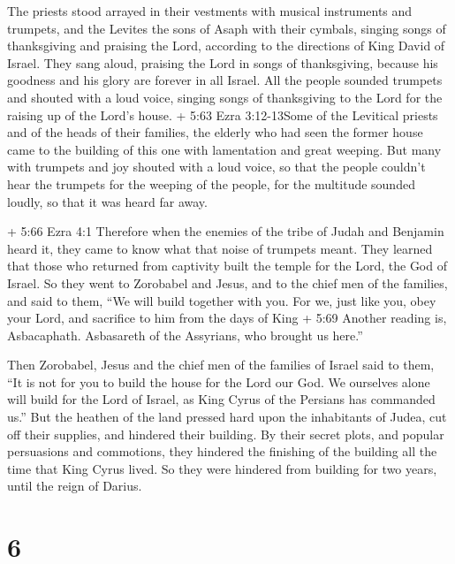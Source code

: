  The priests stood arrayed in their vestments with musical
instruments and trumpets, and the Levites the sons of Asaph with their
cymbals,  singing songs of thanksgiving and praising the
Lord, according to the directions of King David of Israel. 
They sang aloud, praising the Lord in songs of thanksgiving, because his
goodness and his glory are forever in all Israel.  All the
people sounded trumpets and shouted with a loud voice, singing songs of
thanksgiving to the Lord for the raising up of the Lord's house.
 + 5:63 Ezra 3:12-13Some of the Levitical priests and of
the heads of their families, the elderly who had seen the former house
came to the building of this one with lamentation and great weeping.
 But many with trumpets and joy shouted with a loud voice,
 so that the people couldn't hear the trumpets for the
weeping of the people, for the multitude sounded loudly, so that it was
heard far away.

 + 5:66 Ezra 4:1 Therefore when the enemies of the tribe of
Judah and Benjamin heard it, they came to know what that noise of
trumpets meant.  They learned that those who returned from
captivity built the temple for the Lord, the God of Israel.
 So they went to Zorobabel and Jesus, and to the chief men
of the families, and said to them, ``We will build together with you.
 For we, just like you, obey your Lord, and sacrifice to
him from the days of King + 5:69 Another reading is, Asbacaphath.
Asbasareth of the Assyrians, who brought us here.''

 Then Zorobabel, Jesus and the chief men of the families of
Israel said to them, ``It is not for you to build the house for the Lord
our God.  We ourselves alone will build for the Lord of
Israel, as King Cyrus of the Persians has commanded us.'' 
But the heathen of the land pressed hard upon the inhabitants of Judea,
cut off their supplies, and hindered their building.  By
their secret plots, and popular persuasions and commotions, they
hindered the finishing of the building all the time that King Cyrus
lived. So they were hindered from building for two years, until the
reign of Darius.

\hypertarget{section-5}{%
\section{6}\label{section-5}}

